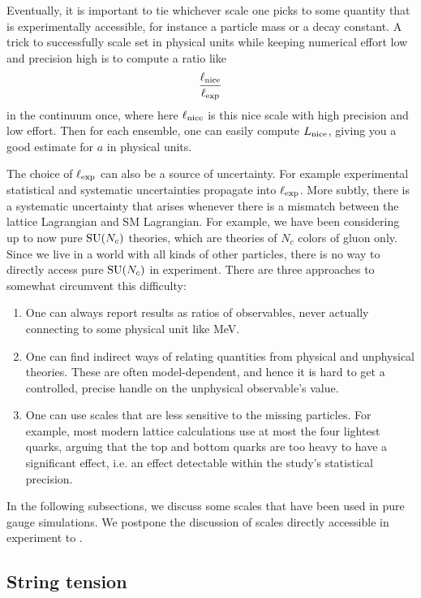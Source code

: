 Eventually, it is important to tie whichever scale one picks to some
quantity that is experimentally accessible, for instance a particle
mass or a decay constant. A trick to successfully scale set in physical
units while keeping numerical effort low and precision high is to
compute a ratio like
\begin{equation}
\frac{\ell_{\rm nice}}{\ell_{\rm exp}}
\end{equation}
in the continuum once, where here $\ell_{\rm nice}$ is this nice scale with
high precision and low effort. Then for each ensemble, one can
easily compute $L_{\rm nice}$, giving you a good estimate for $a$ in physical units.


The choice of $\ell_{\rm exp}$ can also be a source of uncertainty. For example
experimental statistical and systematic uncertainties propagate into 
$\ell_{\rm exp}$. More subtly, there is a systematic uncertainty that arises
whenever there is a mismatch between the lattice Lagrangian and SM Lagrangian.
For example, we have been considering up to now pure $\operatorname{SU}(N_c)$ theories, which
are theories of $N_c$ colors of gluon only. Since we live in a world with all
kinds of other particles, there is no way to directly access pure $\operatorname{SU}(N_c)$ in
experiment. There are three approaches to somewhat circumvent this difficulty:
\begin{enumerate}
\item One can always report results as ratios of observables, never actually
connecting to some physical unit like MeV.
\item One can find indirect ways of relating quantities from physical and
unphysical theories. These are often model-dependent, and hence it is hard to
get a controlled, precise handle on the unphysical observable's value.
\item One can use scales that are less sensitive to the missing particles. For
example, most modern lattice calculations use at most the four lightest quarks,
arguing that the top and bottom quarks are too heavy to have a significant
effect, i.e. an effect detectable within the study's statistical precision.
\end{enumerate}
In the following subsections, we discuss some scales that have been used in pure
gauge simulations. We postpone the discussion of scales directly accessible in
experiment to .


\subsection{String tension}


